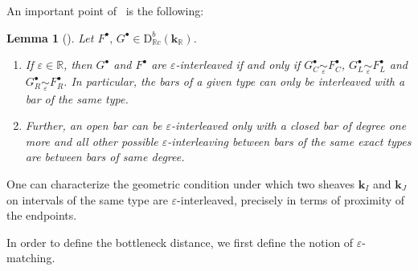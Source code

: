 \documentclass[a4paper, english, 11pt]{article}
\newcommand{\kk}[0]{\textbf{k}}
\newcommand{\0}{\vec{0}}
\newcommand{\R}[0]{\mathbb{R}}
\newcommand{\D}[0]{\text{D}}
\newtheorem{lem}[prop]{Lemma}
\begin{document}
An important point of~\cite{Berk18} is the following:
\begin{lem}[\cite{Berk18}]\label{L:Caracinterleaving} Let $F^\bullet, \, G^\bullet \in \D^b_{\R c}(\kk_\R)$.
\begin{enumerate}
\item If $\varepsilon \in \R$, then $G^\bullet$ and $F^\bullet$ are $\varepsilon$-interleaved if and only if 
 $G_C^\bullet \mathop{\sim}\limits_{\varepsilon} F_C^\bullet$, $G_L^\bullet \mathop{\sim}\limits_{\varepsilon} F_L^\bullet$ and $G_R^\bullet \mathop{\sim}\limits_{\varepsilon} F_R^\bullet$. In particular, 
 the bars of a given type can only be interleaved with a bar of the same type.
 \item Further, an open bar can be $\varepsilon$-interleaved only with a closed bar of degree one more and all other possible $\varepsilon$-interleaving between bars of the same exact types are between bars of same degree. \end{enumerate}
\end{lem}
One can characterize the geometric  condition under which two sheaves $\kk_I$ and $\kk_J$ on intervals of the same type are $\varepsilon$-interleaved, precisely in terms of proximity of the endpoints.

 In order to define the bottleneck distance, we first define the notion of $\varepsilon$-matching. 
 
\end{document}
